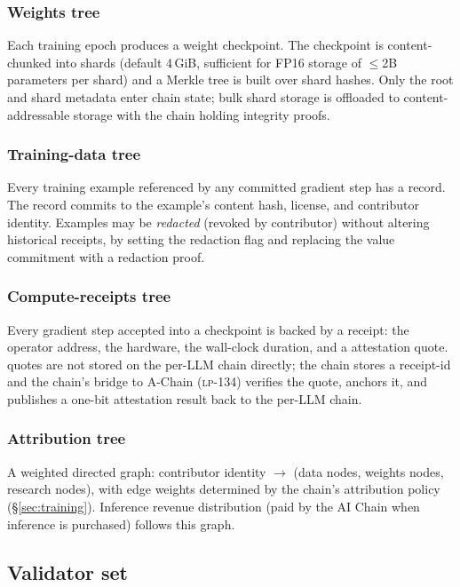 \subsubsection{Weights tree}
Each training epoch produces a weight checkpoint. The checkpoint is content-chunked into shards (default 4\,GiB, sufficient for FP16 storage of $\le$2B parameters per shard) and a Merkle tree is built over shard hashes. Only the root and shard metadata enter chain state; bulk shard storage is offloaded to content-addressable storage with the chain holding integrity proofs.

\subsubsection{Training-data tree}
Every training example referenced by any committed gradient step has a record. The record commits to the example's content hash, license, and contributor identity. Examples may be \emph{redacted} (revoked by contributor) without altering historical receipts, by setting the redaction flag and replacing the value commitment with a redaction proof.

\subsubsection{Compute-receipts tree}
Every gradient step accepted into a checkpoint is backed by a receipt: the operator address, the \GPU{} hardware, the wall-clock duration, and a \TEE{} attestation quote. \TEE{} quotes are not stored on the per-LLM chain directly; the chain stores a receipt-id and the chain's bridge to \Lux{} A-Chain (\textsc{lp-134}) verifies the quote, anchors it, and publishes a one-bit attestation result back to the per-LLM chain.

\subsubsection{Attribution tree}
A weighted directed graph: contributor identity $\rightarrow$ (data nodes, weights nodes, research nodes), with edge weights determined by the chain's attribution policy (\S\ref{sec:training}). Inference revenue distribution (paid by the \Hanzo{} AI Chain when inference is purchased) follows this graph.

\subsection{Validator set}

